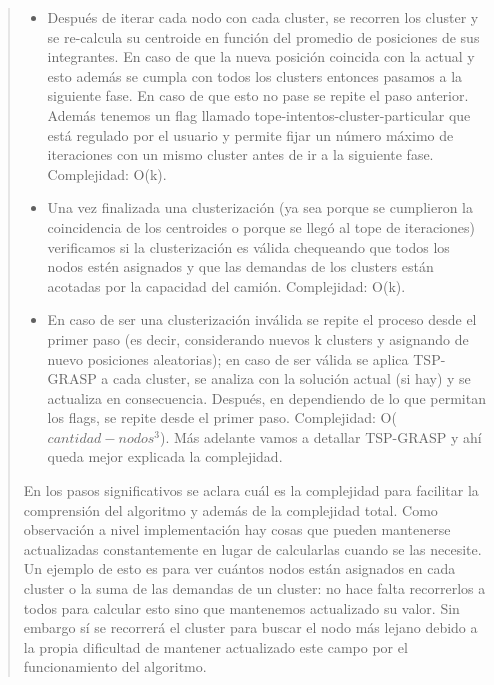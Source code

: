 \documentclass[11pt,a4paper]{article}
\begin{document}
\begin{verse}
\begin{itemize}
\item Después de iterar cada nodo con cada cluster, se recorren los cluster y se re-calcula su centroide en función del promedio de posiciones de sus integrantes. En caso de que la nueva posición coincida con la actual y esto además se cumpla con todos los clusters entonces pasamos a la siguiente fase. En caso de que esto no pase se repite el paso anterior. Además tenemos un flag llamado tope-intentos-cluster-particular que está regulado por el usuario y permite fijar un número máximo de iteraciones con un mismo cluster antes de ir a la siguiente fase. Complejidad: O(k).
\item Una vez finalizada una clusterización (ya sea porque se cumplieron la coincidencia de los centroides o porque se llegó al tope de iteraciones) verificamos si la clusterización es válida chequeando que todos los nodos estén asignados y que las demandas de los clusters están acotadas por la capacidad del camión. Complejidad: O(k).
\item En caso de ser una clusterización inválida se repite el proceso desde el primer paso (es decir, considerando nuevos k clusters y asignando de nuevo posiciones aleatorias); en caso de ser válida se aplica TSP-GRASP a cada cluster, se analiza con la solución actual (si hay) y se actualiza en consecuencia. Después, en dependiendo de lo que permitan los flags, se repite desde el primer paso. Complejidad: O($cantidad-nodos^{3}$). Más adelante vamos a detallar TSP-GRASP y ahí queda mejor explicada la complejidad.
\end{itemize}

En los pasos significativos se aclara cuál es la complejidad para facilitar la comprensión del algoritmo y además de la complejidad total. Como observación a nivel implementación hay cosas que pueden mantenerse actualizadas constantemente en lugar de calcularlas cuando se las necesite. Un ejemplo de esto es para ver cuántos nodos están asignados en cada cluster o la suma de las demandas de un cluster: no hace falta recorrerlos a todos para calcular esto sino que mantenemos actualizado su valor. Sin embargo sí se recorrerá el cluster para buscar el nodo más lejano debido a la propia dificultad de mantener actualizado este campo por el funcionamiento del algoritmo.


\end{verse}
\end{document}
